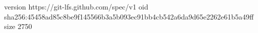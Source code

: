 version https://git-lfs.github.com/spec/v1
oid sha256:45458ad85c8be9f145566b3a5b093ec91bb4cb542a6da9d65e2262e61b5a49ff
size 2750
